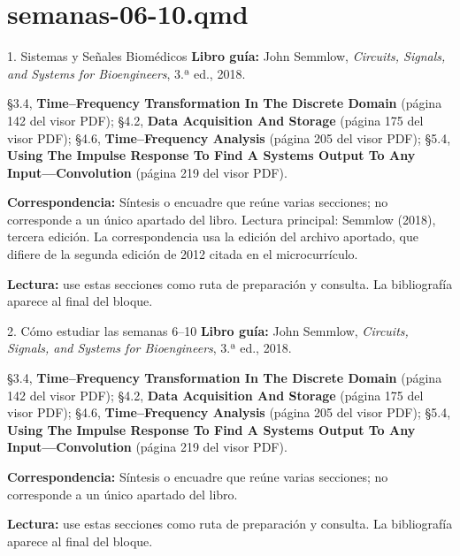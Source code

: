 \documentclass[
  10pt,
  ignorenonframetext,
  aspectratio=169,
  spanish,
]{beamer}
\begin{document}
\section{semanas-06-10.qmd}\label{semanas-06-10.qmd}

\begin{frame}{1. Sistemas y Señales Biomédicos}
\label{sistemas-y-seuxf1ales-biomuxe9dicos-1}
\textbf{Libro guía:} John Semmlow, \emph{Circuits, Signals, and Systems
for Bioengineers}, 3.ª ed., 2018.

§3.4, \textbf{Time--Frequency Transformation In The Discrete Domain}
(página 142 del visor PDF); §4.2, \textbf{Data Acquisition And Storage}
(página 175 del visor PDF); §4.6, \textbf{Time--Frequency Analysis}
(página 205 del visor PDF); §5.4, \textbf{Using The Impulse Response To
Find A Systems Output To Any Input---Convolution} (página 219 del visor
PDF).

\textbf{Correspondencia:} Síntesis o encuadre que reúne varias
secciones; no corresponde a un único apartado del libro. Lectura
principal: Semmlow (2018), tercera edición. La correspondencia usa la
edición del archivo aportado, que difiere de la segunda edición de 2012
citada en el microcurrículo.

\textbf{Lectura:} use estas secciones como ruta de preparación y
consulta. La bibliografía aparece al final del bloque.
\end{frame}

\begin{frame}{2. Cómo estudiar las semanas 6--10}
\label{cuxf3mo-estudiar-las-semanas-610}
\textbf{Libro guía:} John Semmlow, \emph{Circuits, Signals, and Systems
for Bioengineers}, 3.ª ed., 2018.

§3.4, \textbf{Time--Frequency Transformation In The Discrete Domain}
(página 142 del visor PDF); §4.2, \textbf{Data Acquisition And Storage}
(página 175 del visor PDF); §4.6, \textbf{Time--Frequency Analysis}
(página 205 del visor PDF); §5.4, \textbf{Using The Impulse Response To
Find A Systems Output To Any Input---Convolution} (página 219 del visor
PDF).

\textbf{Correspondencia:} Síntesis o encuadre que reúne varias
secciones; no corresponde a un único apartado del libro.

\textbf{Lectura:} use estas secciones como ruta de preparación y
consulta. La bibliografía aparece al final del bloque.
\end{frame}
\end{document}
